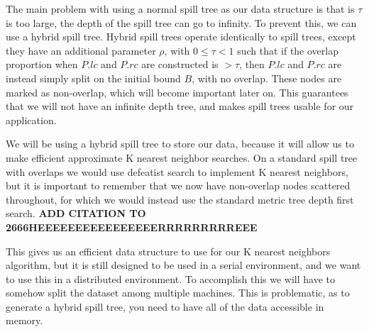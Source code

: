 \vspace{5 mm}
\noindent
The main problem with using a normal spill tree as our data structure is that is
$\tau$ is too large, the depth of the spill tree can go to infinity.  To prevent
this, we can use a hybrid spill tree.  Hybrid spill trees operate identically to
spill trees, except they have an additional parameter $\rho$, with $0 \le \tau <
1$  such that if the overlap proportion when $P.lc$ and $P.rc$ are constructed
is  $> \tau$, then $P.lc$ and $P.rc$ are instead simply split on the initial
bound  $B$, with no overlap.  These nodes are marked as non-overlap, which will
become  important later on.  This guarantees that we will not have an infinite
depth  tree, and makes spill trees usable for our application.

\vspace{5 mm}
\noindent
We will be using a hybrid spill tree to store our data, because it will allow us
to make efficient approximate K nearest neighbor searches.  On a standard spill
tree with overlaps we would use defeatist search to implement K nearest
neighbors,  but it is important to remember that we now have non-overlap nodes
scattered  throughout, for which we would instead use the standard metric tree
depth first  search. \textbf{ADD CITATION TO 2666HEEEEEEEEEEEEEEEERRRRRRRRREEE}

\vspace{5 mm}
\noindent
This gives us an efficient data structure to use for our K nearest neighbors
algorithm, but it is still designed to be used in a serial environment, and we
want to use this in a distributed environment.  To accomplish this we will have
to somehow split the dataset among multiple machines.  This is problematic, as
to generate a hybrid spill tree, you need to have all of the data accessible in
memory.


